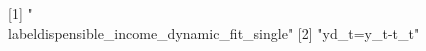 [1] "\\label{dispensible_income_dynamic_fit_single}"
[2] "{yd_{t}}={y_{t}}-{t_{t}}"                      
